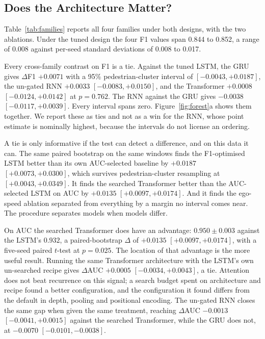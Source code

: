 \documentclass[mti,article,submit,moreauthors]{Definitions/mdpi}
\begin{document}
\subsection{Does the Architecture Matter?}

Table~\ref{tab:families} reports all four families under both designs, with the two ablations. Under the tuned design the four F1 values span 0.844 to 0.852, a range of 0.008 against per-seed standard deviations of 0.008 to 0.017.

Every cross-family contrast on F1 is a tie. Against the tuned LSTM, the GRU gives $\Delta$F1 $+0.0071$ with a 95\% pedestrian-cluster interval of $[-0.0043, +0.0187]$, the un-gated RNN $+0.0033$ $[-0.0083, +0.0150]$, and the Transformer $+0.0008$ $[-0.0124, +0.0142]$ at $p = 0.762$. The RNN against the GRU gives $-0.0038$ $[-0.0117, +0.0039]$. Every interval spans zero. Figure~\ref{fig:forest}a shows them together. We report these as ties and not as a win for the RNN, whose point estimate is nominally highest, because the intervals do not license an ordering.

A tie is only informative if the test can detect a difference, and on this data it can. The same paired bootstrap on the same windows finds the F1-optimised LSTM better than its own AUC-selected baseline by $+0.0187$ $[+0.0073, +0.0300]$, which survives pedestrian-cluster resampling at $[+0.0043, +0.0349]$. It finds the searched Transformer better than the AUC-selected LSTM on AUC by $+0.0135$ $[+0.0097, +0.0174]$. And it finds the ego-speed ablation separated from everything by a margin no interval comes near. The procedure separates models when models differ.

On AUC the searched Transformer does have an advantage: $0.950 \pm 0.003$ against the LSTM's $0.932$, a paired-bootstrap $\Delta$ of $+0.0135$ $[+0.0097, +0.0174]$, with a five-seed paired $t$-test at $p = 0.025$. The location of that advantage is the more useful result. Running the same Transformer architecture with the LSTM's own un-searched recipe gives $\Delta$AUC $+0.0005$ $[-0.0034, +0.0043]$, a tie. Attention does not beat recurrence on this signal; a search budget spent on architecture and recipe found a better configuration, and the configuration it found differs from the default in depth, pooling and positional encoding. The un-gated RNN closes the same gap when given the same treatment, reaching $\Delta$AUC $-0.0013$ $[-0.0041, +0.0015]$ against the searched Transformer, while the GRU does not, at $-0.0070$ $[-0.0101, -0.0038]$.
\end{document}
